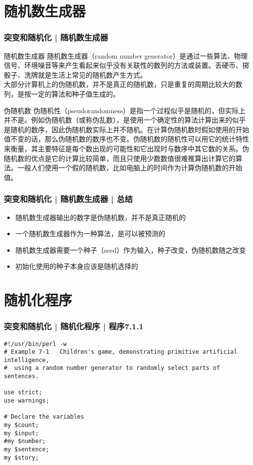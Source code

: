 \section{随机数生成器}
\begin{frame}
  \frametitle{突变和随机化 | 随机数生成器}
  \begin{block}{随机数生成器}
    随机数生成器（random number generator）是通过一些算法、物理信号、环境噪音等来产生看起来似乎没有关联性的数列的方法或装置。丢硬币、掷骰子、洗牌就是生活上常见的随机数产生方式。\\
    大部分计算机上的伪随机数，并不是真正的随机数，只是重复的周期比较大的数列，是按一定的算法和种子值生成的。
  \end{block}
  \pause
  \vspace{-0.5em}
  \begin{block}{伪随机数}
伪随机性（pseudorandomness）是指一个过程似乎是随机的，但实际上并不是。例如伪随机数（或称伪乱数），是使用一个确定性的算法计算出来的似乎是随机的数序，因此伪随机数实际上并不随机。在计算伪随机数时假如使用的开始值不变的话，那么伪随机数的数序也不变。伪随机数的随机性可以用它的统计特性来衡量，其主要特征是每个数出现的可能性和它出现时与数序中其它数的关系。伪随机数的优点是它的计算比较简单，而且只使用少数数值很难推算出计算它的算法。一般人们使用一个假的随机数，比如电脑上的时间作为计算伪随机数的开始值。
  \end{block}
\end{frame}

\begin{frame}
  \frametitle{突变和随机化 | 随机数生成器 | \alert{总结}}
  \begin{itemize}
    \item 随机数生成器输出的数字是伪随机数，并不是真正随机的
    \item 一个随机数生成器作为一种算法，是可以被预测的
    \item 随机数生成器需要一个种子（seed）作为输入，种子改变，伪随机数随之改变
    \item 初始化使用的种子本身应该是随机选择的
  \end{itemize}
\end{frame}

\section{随机化程序}
\begin{frame}[fragile]
  \frametitle{突变和随机化 | 随机化程序 | 程序7.1.1}
  \vspace{-1.5em}
\begin{lstlisting}[firstnumber=1,basicstyle=\small\tt]
#!/usr/bin/perl -w
# Example 7-1   Children's game, demonstrating primitive artificial intelligence,
#  using a random number generator to randomly select parts of sentences.

use strict;
use warnings;

# Declare the variables
my $count;
my $input;
#my $number;
my $sentence;
my $story;
\end{lstlisting}
\end{frame}

